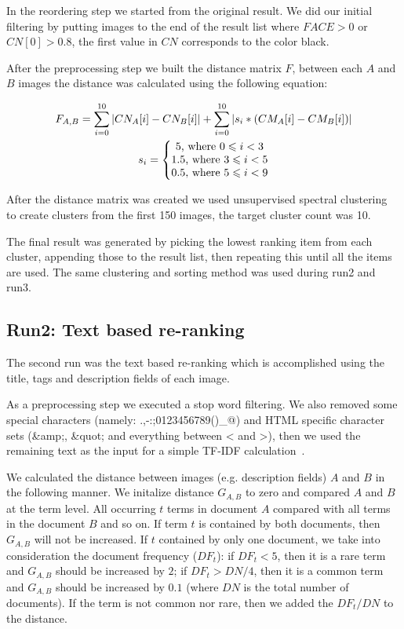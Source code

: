 \documentclass{acm_proc_article-me}
\begin{document}
In the reordering step we started from the original result. We did our initial filtering by putting images to the end of the result list where $FACE>0$ or $CN[0]>0.8$, the first value in $CN$ corresponds to the color black.

After the preprocessing step we built the distance matrix $F$, between each $A$ and $B$ images the distance was calculated using the following equation:

\begin{gather*} 
F_{A,B} = \sum_{i=0}^{10}  \left | CN_{A}[i]-CN_{B}[i] \right | +\sum_{i=0}^{10} \left | s_i * (CM_{A}[i]-CM_{B}[i]) \right |\\
s_i = \left\{\begin{matrix}
5 \textup{, where }0 \leqslant  i < 3\\ 
1.5 \textup{, where }3 \leqslant  i < 5\\ 
0.5 \textup{, where }5 \leqslant  i < 9
\end{matrix}\right.
\end{gather*}

After the distance matrix was created we used unsupervised spectral clustering~\cite{Ma2009,Ng01onspectral} to create clusters from the first 150 images, the target cluster count was 10. 

The final result was generated by picking the lowest ranking item from each cluster, appending those to the result list, then repeating this until all the items are used. The same clustering and sorting method was used during run2 and run3.

\subsection{Run2: Text based re-ranking}\label{run2}
The second run was the text based re-ranking which is accomplished using the title, tags and description fields of each image.

As a preprocessing step we executed a stop word filtering. We also removed some special characters (namely: .,-:;0123456789()\_@) and HTML specific character sets (\&amp;, \&quot; and everything between < and >), then we used the remaining text as the input for a simple TF-IDF calculation~\cite{Yeh2008}. 

 We calculated the distance between images (e.g. description fields) $A$ and $B$ in the following manner. We initalize distance $G_{A,B}$ to zero and compared $A$ and $B$ at the term level. All occurring $t$ terms in document $A$ compared with all terms in the document $B$ and so on. If term $t$ is contained by both documents, then $G_{A,B}$ will not be increased. If $t$ contained by only one document, we take into consideration the document frequency ($DF_t$): if $DF_t<5$, then it is a rare term and $G_{A,B}$ should be increased by $2$; if $DF_t>DN/4$, then it is a common term and  $G_{A,B}$ should be increased by $0.1$ (where $DN$ is the total number of documents). If the term is not common nor rare, then we added the $DF_t/DN$ to the distance. 
 
\end{document}
